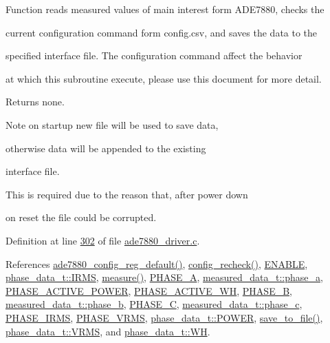  

Function reads measured values of main interest form A\-D\-E7880, checks the \par
 current configuration command form config.\-csv, and saves the data to the \par
 specified interface file. The configuration command affect the behavior \par
 at which this subroutine execute, please use this document for more detail.

\begin{DoxyReturn}{Returns}
none. 

 
\end{DoxyReturn}
\begin{DoxyNote}{Note}
on startup new file will be used to save data, \par
 otherwise data will be appended to the existing \par
 interface file. \par
 This is required due to the reason that, after power down \par
 on reset the file could be corrupted.
\end{DoxyNote}


Definition at line \hyperlink{a00034_source_l00302}{302} of file \hyperlink{a00034_source}{ade7880\-\_\-driver.\-c}.



References \hyperlink{a00004_ga7782772c18e6ea515dcd28dcaedd0f06}{ade7880\-\_\-config\-\_\-reg\-\_\-default()}, \hyperlink{a00034_source_l00482}{config\-\_\-recheck()}, \hyperlink{a00036_source_l00040}{E\-N\-A\-B\-L\-E}, \hyperlink{a00036_source_l00017}{phase\-\_\-data\-\_\-t\-::\-I\-R\-M\-S}, \hyperlink{a00041_source_l00040}{measure()}, \hyperlink{a00042_source_l00021}{P\-H\-A\-S\-E\-\_\-\-A}, \hyperlink{a00036_source_l00028}{measured\-\_\-data\-\_\-t\-::phase\-\_\-a}, \hyperlink{a00042_source_l00030}{P\-H\-A\-S\-E\-\_\-\-A\-C\-T\-I\-V\-E\-\_\-\-P\-O\-W\-E\-R}, \hyperlink{a00042_source_l00028}{P\-H\-A\-S\-E\-\_\-\-A\-C\-T\-I\-V\-E\-\_\-\-W\-H}, \hyperlink{a00042_source_l00022}{P\-H\-A\-S\-E\-\_\-\-B}, \hyperlink{a00036_source_l00029}{measured\-\_\-data\-\_\-t\-::phase\-\_\-b}, \hyperlink{a00042_source_l00023}{P\-H\-A\-S\-E\-\_\-\-C}, \hyperlink{a00036_source_l00030}{measured\-\_\-data\-\_\-t\-::phase\-\_\-c}, \hyperlink{a00042_source_l00027}{P\-H\-A\-S\-E\-\_\-\-I\-R\-M\-S}, \hyperlink{a00042_source_l00026}{P\-H\-A\-S\-E\-\_\-\-V\-R\-M\-S}, \hyperlink{a00036_source_l00020}{phase\-\_\-data\-\_\-t\-::\-P\-O\-W\-E\-R}, \hyperlink{a00034_source_l00421}{save\-\_\-to\-\_\-file()}, \hyperlink{a00036_source_l00018}{phase\-\_\-data\-\_\-t\-::\-V\-R\-M\-S}, and \hyperlink{a00036_source_l00019}{phase\-\_\-data\-\_\-t\-::\-W\-H}.



